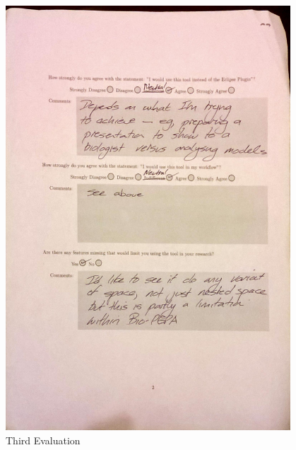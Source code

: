 \begin{figure}[h!]
    \centering
    \includegraphics[width=0.95\textwidth]{images/user_eval/user_eval_22.jpg}
    \caption{Third Evaluation}
\end{figure}

